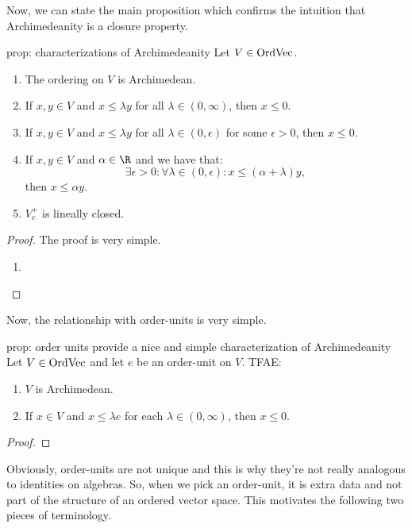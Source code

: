 \documentclass[main.tex]{subfiles}
\begin{document}
Now, we can state the main proposition which confirms the intuition that Archimedeanity is a closure property. 

\begin{proposition}{}{prop: characterizations of Archimedeanity}
Let $V \in \text{OrdVec}$. 
\begin{enumerate}
    \item The ordering on $V$ is Archimedean. 
    \item If $x,y \in V$ and $x \leq \lambda y$ for all $\lambda \in (0,\infty)$, then $x \leq 0$. 
    \item  If $x,y \in V$ and $x \leq \lambda y$ for all $\lambda \in (0,\epsilon)$ for some $\epsilon > 0$, then $x \leq 0$. 
    \item If $x,y \in V$ and $\alpha \in \R$ and we have that:
    \[\exists \epsilon > 0: \forall \lambda \in (0,\epsilon): x \leq (\alpha+\lambda)y,\]     
    then $x \leq \alpha y$.  
    \item $V^+_c$ is lineally closed. 
\end{enumerate}
\end{proposition}
\begin{proof}
The proof is very simple. 
\begin{enumerate}
    \item
\end{enumerate}
\end{proof}

Now, the relationship with order-units is very simple. 

\begin{proposition}{}{prop: order units provide a nice and simple characterization of Archimedeanity}
Let $V \in \text{OrdVec}$ and let $e$ be an order-unit on $V$. TFAE: 
\begin{enumerate}
    \item $V$ is Archimedean. 
    \item If $x \in V$ and $x \leq \lambda e$ for each $\lambda \in (0,\infty)$, then $x \leq 0$. 
\end{enumerate}
\end{proposition}
\begin{proof}
\end{proof}

Obviously, order-units are not unique and this is why they're not really analogous to identities on algebras. So, when we pick an order-unit, it is extra data and not part of the structure of an ordered vector space. This motivates the following two pieces of terminology. 
\end{document}
